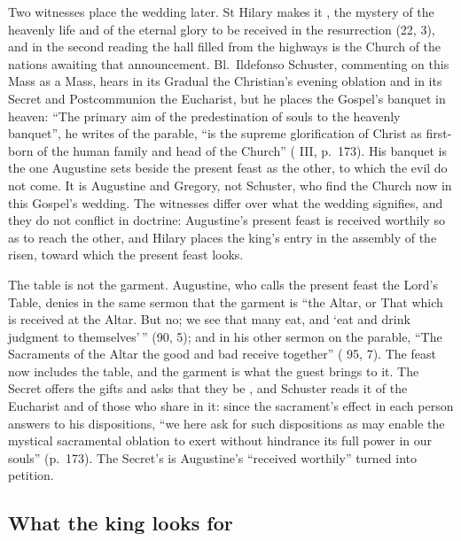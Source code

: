 Two witnesses place the wedding later. St Hilary makes it , the mystery of
the heavenly life and of the eternal glory to be received in the resurrection
(22, 3), and in the second reading the hall filled from the highways is the
Church of the nations awaiting that announcement. Bl.\ Ildefonso Schuster,
commenting on this Mass as a Mass, hears in its Gradual the Christian's evening
oblation and in its Secret and Postcommunion the Eucharist, but he places the
Gospel's banquet in heaven: ``The primary aim of the predestination of souls to
the heavenly banquet'', he writes of the parable, ``is the supreme glorification
of Christ as first-born of the human family and head of the Church'' ( III, p.~173). His banquet is the one Augustine sets beside the
present feast as the other, to which the evil do not come. It is Augustine and
Gregory, not Schuster, who find the Church now in this Gospel's wedding. The
witnesses differ over what the wedding signifies, and they do not conflict in
doctrine: Augustine's present feast is received worthily so as to reach the
other, and Hilary places the king's entry in the assembly of the risen, toward
which the present feast looks.

The table is not the garment. Augustine, who calls the present feast the Lord's
Table, denies in the same sermon that the garment is ``the Altar, or That which
is received at the Altar. But no; we see that many eat, and `eat and drink
judgment to themselves'\,'' (90, 5); and in his other sermon on the parable,
``The Sacraments of the Altar the good and bad receive together'' (
95, 7). The feast now includes the table, and the garment is what the guest
brings to it. The Secret offers the gifts  and asks that they be ,
and Schuster reads it of the Eucharist and of those who share in it: since the
sacrament's effect in each person answers to his dispositions, ``we here ask for
such dispositions as may enable the mystical sacramental oblation to exert
without hindrance its full power in our souls'' (p.~173). The Secret's
 is Augustine's ``received worthily'' turned into
petition.

\subsection{What the king looks for}

